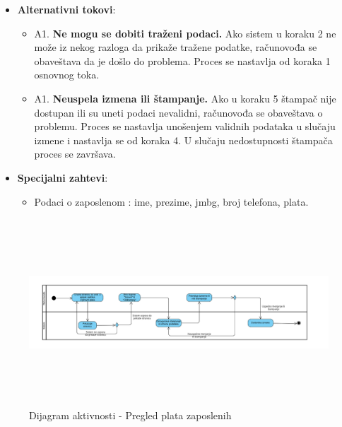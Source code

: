 \begin{itemize}
  \item \textbf{Alternativni tokovi}:
      \begin{itemize}
        \item A1. \textbf{Ne mogu se dobiti traženi podaci.}
        Ako sistem u koraku 2 ne može iz nekog razloga da prikaže tražene podatke, računovođa se obaveštava da je došlo do problema.
        Proces se nastavlja od koraka 1 osnovnog toka.
        \item A1. \textbf{Neuspela izmena ili štampanje.}
        Ako u koraku 5 štampač nije dostupan ili su uneti podaci nevalidni, računovođa se obaveštava o problemu. Proces se nastavlja unošenjem
        validnih podataka u slučaju izmene i nastavlja se od koraka 4. U slučaju nedostupnosti štampača proces se završava.
      \end{itemize}

      
  \item \textbf{Specijalni zahtevi}:
      \begin{itemize}
        \item Podaci o zaposlenom : ime, prezime, jmbg, broj telefona, plata.
      \end{itemize}
\end{itemize}

\begin{figure}[H]
  \begin{center}
      \includegraphics[width=140mm, height=70mm]{Diagrams/pregled_zaposlenih.png}
  \end{center}
  \caption {Dijagram aktivnosti - Pregled plata zaposlenih}
  \label{activity_pregled_zaposlenih}

\end{figure}
